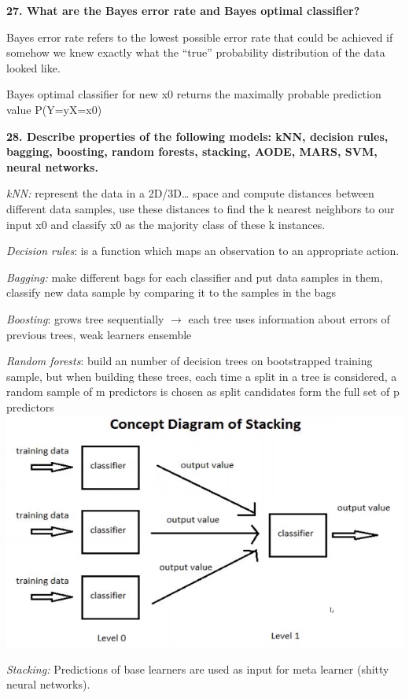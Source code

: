 \textbf{27. What are the Bayes error rate and Bayes optimal classifier?}

Bayes error rate refers to the lowest possible error rate that could be
achieved if somehow we knew exactly what the ``true'' probability
distribution of the data looked like.

Bayes optimal classifier for new x0 returns the maximally probable
prediction value P(Y=y\textbar X=x0)

\textbf{28. Describe properties of the following models: kNN, decision
rules, bagging, boosting, random forests, stacking, AODE, MARS, SVM,
neural networks.}

\textit{kNN:} represent the data in a 2D/3D\ldots{} space and compute
distances between different data samples, use these distances to find
the k nearest neighbors to our input x0 and classify x0 as the majority
class of these k instances.

\textit{Decision rules}: is a function which maps an observation to
an appropriate action.

\textit{Bagging:} make different bags for each classifier and put
data samples in them, classify new data sample by comparing it to the
samples in the bags

\textit{Boosting}: grows tree sequentially $\rightarrow$ each tree
uses information about errors of previous trees, weak learners ensemble

\textit{Random forests}: build an number of decision trees on
bootstrapped training sample, but when building these trees, each time a
split in a tree is considered, a random sample of m predictors is chosen
as split candidates form the full set of p
predictors
\includegraphics[width=\columnwidth]{media/image35.png}

\textit{Stacking:} Predictions of base learners are used as input for
meta learner (shitty neural networks).

